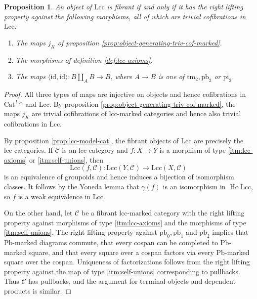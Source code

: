 \documentclass[a4paper]{article}
\newtheorem{proposition}[theorem]{Proposition}
\theoremstyle{remark}
\theoremstyle{definition}
\begin{document}
\begin{proposition}
  \label{prop:object-generating-triv-cof-lcc}
  An object of $\mathrm{Lcc}$ is fibrant if and only if it has the right lifting property against the following morphisms, all of which are trivial cofibrations in $\mathrm{Lcc}$:
  \begin{enumerate}
    \item
      \label{itm:marking-stability}
      The maps $j_K$ of proposition \ref{prop:object-generating-triv-cof-marked}.
    \item
      \label{itm:lcc-axioms}
      The morphisms of definition \ref{def:lcc-axioms}.
    \item
      \label{itm:self-unions}
      The maps $\langle \mathrm{id}, \mathrm{id} \rangle : B \amalg_A B \rightarrow B$, where $A \rightarrow B$  is one of $\mathrm{tm}_2, \mathrm{pb}_2$ or $\mathrm{pi}_2$.
  \end{enumerate}
\end{proposition}
\begin{proof}
  All three types of maps are injective on objects and hence cofibrations in $\mathrm{Cat}^{I_\mathrm{Lcc}}$ and $\mathrm{Lcc}$.
  By proposition \ref{prop:object-generating-triv-cof-marked}, the maps $j_K$ are trivial cofibrations of lcc-marked categories and hence also trivial cofibrations in $\mathrm{Lcc}$.

  By proposition \ref{prop:lcc-model-cat}, the fibrant objects of $\mathrm{Lcc}$ are precisely the lcc categories. 
  If $\mathcal{C}$ is an lcc category and $f : X \rightarrow Y$ is a morphism of type \ref{itm:lcc-axioms} or \ref{itm:self-unions}, then 
  \begin{equation}
    \mathrm{Lcc}(f, \mathcal{C}) : \mathrm{Lcc}(Y, \mathcal{C}) \rightarrow \mathrm{Lcc}(X, \mathcal{C})
  \end{equation}
  is an equivalence of groupoids and hence induces a bijection of isomorphism classes.
  It follows by the Yoneda lemma that $\gamma(f)$ is an isomorphism in $\operatorname{Ho} \mathrm{Lcc}$, so $f$ is  a weak equivalence in $\mathrm{Lcc}$.

  On the other hand, let $\mathcal{C}$ be a fibrant lcc-marked category with the right lifting property against morphisms of type \ref{itm:lcc-axioms} and the morphisms of type \ref{itm:self-unions}.
  The right lifting property against $\mathrm{pb}_0, \mathrm{pb}_1$ and $\mathrm{pb}_2$ implies that $\mathrm{Pb}$-marked diagrams commute, that every cospan can be completed to $\mathrm{Pb}$-marked square, and that every square over a cospan factors via every $\mathrm{Pb}$-marked square over the cospan.
  Uniqueness of factorizations follows from the right lifting property against the map of type \ref{itm:self-unions} corresponding to pullbacks.
  Thus $\mathcal{C}$ has pullbacks, and the argument for terminal objects and dependent products is similar.
\end{proof}
\end{document}
